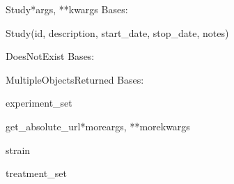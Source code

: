 \documentclass[letterpaper,10pt,english]{sphinxmanual}
\begin{document}
\hypertarget{data.models.Study}{}\begin{classdesc}{Study}{*args, **kwargs}
Bases: 

Study(id, description, start\_date, stop\_date, notes)

\hypertarget{data.models.Study.DoesNotExist}{}\begin{excdesc}{DoesNotExist}
Bases: 
\end{excdesc}

\hypertarget{data.models.Study.MultipleObjectsReturned}{}\begin{excdesc}{MultipleObjectsReturned}
Bases: 
\end{excdesc}

\hypertarget{data.models.Study.experiment\_set}{}\begin{memberdesc}[Study]{experiment\_set}\end{memberdesc}

\hypertarget{data.models.Study.get\_absolute\_url}{}\begin{methoddesc}[Study]{get\_absolute\_url}{*moreargs, **morekwargs}\end{methoddesc}

\hypertarget{data.models.Study.strain}{}\begin{memberdesc}[Study]{strain}\end{memberdesc}

\hypertarget{data.models.Study.treatment\_set}{}\begin{memberdesc}[Study]{treatment\_set}\end{memberdesc}
\end{classdesc}
\end{document}

